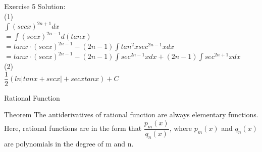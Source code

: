 \documentclass{beamer}
\begin{document}
\begin{frame}{Exercise 5}
    Solution:\\
    (1)\\
    $\int(secx)^{2n+1}dx$\\$=\int(secx)^{2n-1}d(tanx)$\\
    $=tanx\cdot(secx)^{2n-1}-(2n-1)\int tan^2x sec^{2n-1}xdx$\\
    $=tanx\cdot(secx)^{2n-1}-(2n-1)\int sec^{2n-1}xdx+(2n-1)\int sec^{2n+1}xdx$\\
    (2)\\
    $\dfrac{1}{2}(ln|tanx+secx|+secxtanx)+C$
\end{frame}

\begin{frame}{Rational Function}
    \begin{block}{Theorem}
    The antiderivatives of rational function are always elementary functions.\\
    Here, rational functions are in the form that $\dfrac{p_m(x)}{q_n(x)}$, where $p_m(x)$ and $q_n(x)$ are polynomials in the degree of m and n.
    \end{block}

\end{frame}
\end{document}
